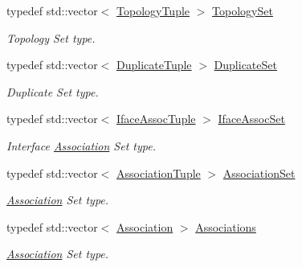 \begin{DoxyCompactItemize}
typedef std\+::vector$<$ \hyperlink{structns3_1_1olsr_1_1TopologyTuple}{Topology\+Tuple} $>$ \hyperlink{namespacens3_1_1olsr_aa5a4b5a4c916439ca513b91928d7eba0}{Topology\+Set}
\begin{DoxyCompactList}\small\item\em Topology Set type. \end{DoxyCompactList}\item 
typedef std\+::vector$<$ \hyperlink{structns3_1_1olsr_1_1DuplicateTuple}{Duplicate\+Tuple} $>$ \hyperlink{namespacens3_1_1olsr_aef00689fee8c925dd464c5d1fee0dee9}{Duplicate\+Set}
\begin{DoxyCompactList}\small\item\em Duplicate Set type. \end{DoxyCompactList}\item 
typedef std\+::vector$<$ \hyperlink{structns3_1_1olsr_1_1IfaceAssocTuple}{Iface\+Assoc\+Tuple} $>$ \hyperlink{namespacens3_1_1olsr_af7456b9ea2cde8c7d88443de06c015f4}{Iface\+Assoc\+Set}
\begin{DoxyCompactList}\small\item\em Interface \hyperlink{structns3_1_1olsr_1_1Association}{Association} Set type. \end{DoxyCompactList}\item 
typedef std\+::vector$<$ \hyperlink{structns3_1_1olsr_1_1AssociationTuple}{Association\+Tuple} $>$ \hyperlink{namespacens3_1_1olsr_a35c0d7e5a941dd49e212f0c9e81ba466}{Association\+Set}
\begin{DoxyCompactList}\small\item\em \hyperlink{structns3_1_1olsr_1_1Association}{Association} Set type. \end{DoxyCompactList}\item 
typedef std\+::vector$<$ \hyperlink{structns3_1_1olsr_1_1Association}{Association} $>$ \hyperlink{namespacens3_1_1olsr_a7aefab4ffae5b289262125647510a2ef}{Associations}
\begin{DoxyCompactList}\small\item\em \hyperlink{structns3_1_1olsr_1_1Association}{Association} Set type. \end{DoxyCompactList}\end{DoxyCompactItemize}
